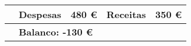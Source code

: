 \begin{center}
{\begin{tabular}{| c | l | r | l | r |}
\hline
							& \textbf{Despesas}		& 480 \euro	& \textbf{Receitas}				& 350 \euro		\\ \hline
							& \multicolumn{4}{|l|}{\textbf{Balanco: -130 \euro}}															\\ \hline
\end{tabular}
}

\end{center}
